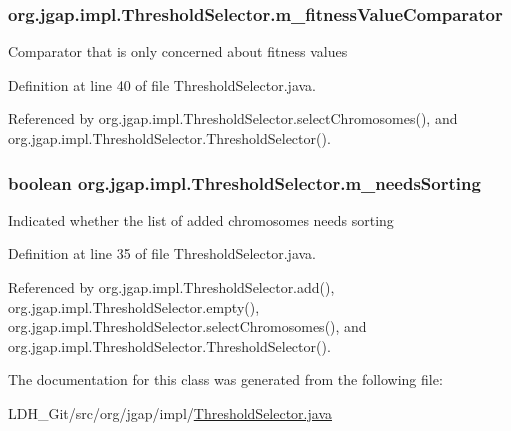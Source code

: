 \hypertarget{classorg_1_1jgap_1_1impl_1_1_threshold_selector_a33a3ccca9c1908e0b42a873eaa89544b}{
\subsubsection[{m\-\_\-fitness\-Value\-Comparator}]{ org.\-jgap.\-impl.\-Threshold\-Selector.\-m\-\_\-fitness\-Value\-Comparator\hspace{0.3cm}{\ttfamily [private]}}}\label{classorg_1_1jgap_1_1impl_1_1_threshold_selector_a33a3ccca9c1908e0b42a873eaa89544b}
Comparator that is only concerned about fitness values 

Definition at line 40 of file Threshold\-Selector.\-java.



Referenced by org.\-jgap.\-impl.\-Threshold\-Selector.\-select\-Chromosomes(), and org.\-jgap.\-impl.\-Threshold\-Selector.\-Threshold\-Selector().

\hypertarget{classorg_1_1jgap_1_1impl_1_1_threshold_selector_a8c0fdf7f12fa4492098068f1678a4e13}{
\subsubsection[{m\-\_\-needs\-Sorting}]{\setlength{\rightskip}{0pt plus 5cm}boolean org.\-jgap.\-impl.\-Threshold\-Selector.\-m\-\_\-needs\-Sorting\hspace{0.3cm}{\ttfamily [private]}}}\label{classorg_1_1jgap_1_1impl_1_1_threshold_selector_a8c0fdf7f12fa4492098068f1678a4e13}
Indicated whether the list of added chromosomes needs sorting 

Definition at line 35 of file Threshold\-Selector.\-java.



Referenced by org.\-jgap.\-impl.\-Threshold\-Selector.\-add(), org.\-jgap.\-impl.\-Threshold\-Selector.\-empty(), org.\-jgap.\-impl.\-Threshold\-Selector.\-select\-Chromosomes(), and org.\-jgap.\-impl.\-Threshold\-Selector.\-Threshold\-Selector().



The documentation for this class was generated from the following file\-:\begin{DoxyCompactItemize}
\item 
L\-D\-H\-\_\-\-Git/src/org/jgap/impl/\hyperlink{_threshold_selector_8java}{Threshold\-Selector.\-java}\end{DoxyCompactItemize}
